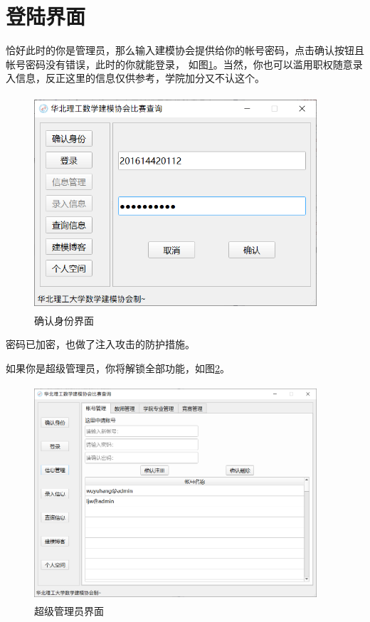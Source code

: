 \documentclass[cn,11pt,chinese, hazy]{elegantbook}
\begin{document}
\section{登陆界面}

恰好此时的你是管理员，那么输入建模协会提供给你的帐号密码，点击确认按钮且帐号密码没有错误，此时的你就能登录，
如图\ref{fig:login}。当然，你也可以滥用职权随意录入信息，反正这里的信息仅供参考，学院加分又不认这个。

\begin{figure}[h]
    \centering
    \includegraphics[width=10.5cm, height=8cm]{figure/3.png}
    \caption{确认身份界面}
    \label{fig:login}
\end{figure}

\begin{remark}
密码已加密，也做了注入攻击的防护措施。
\end{remark}

\newpage

如果你是超级管理员，你将解锁全部功能，如图\ref{fig:superadmin}。

\begin{figure}[h]
    \centering
    \includegraphics[width=10.5cm, height=8cm]{figure/4.png}
    \caption{超级管理员界面}
    \label{fig:superadmin}
\end{figure}
\end{document}
